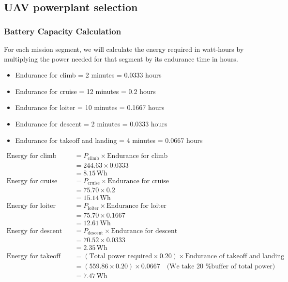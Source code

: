 \documentclass[12 pt]{article}
\begin{document}
\subsection {UAV powerplant selection}

\subsubsection {Battery Capacity Calculation}

For each mission segment, we will calculate the energy required in watt-hours by multiplying the power needed for that segment by its endurance time in hours.

\begin{itemize}
    \item Endurance for climb = 2 minutes = 0.0333 hours
    \item Endurance for cruise = 12 minutes = 0.2 hours
    \item Endurance for loiter = 10 minutes = 0.1667 hours
    \item Endurance for descent = 2 minutes = 0.0333 hours
    \item Endurance for takeoff and landing = 4 minutes = 0.0667 hours
\end{itemize}

\begin{align*}
\text{Energy for climb} &= P_{\text{climb}} \times \text{Endurance for climb} \\
&= 244.63 \times 0.0333 \\
&= 8.15 \, \text{Wh} \\[10pt]
\text{Energy for cruise} &= P_{\text{cruise}} \times \text{Endurance for cruise} \\
&= 75.70 \times 0.2 \\
&= 15.14 \, \text{Wh} \\[10pt]
\text{Energy for loiter} &= P_{\text{loiter}} \times \text{Endurance for loiter} \\
&= 75.70 \times 0.1667 \\
&= 12.61 \, \text{Wh} \\[10pt]
\text{Energy for descent} &= P_{\text{descent}} \times \text{Endurance for descent} \\
&= 70.52 \times 0.0333 \\
&= 2.35 \, \text{Wh} \\[10pt]
\text{Energy for takeoff and landing} &= (\text{Total power required} \times 0.20) \times \text{Endurance of takeoff and landing} \\
&= (559.86 \times 0.20) \times 0.0667 \quad \text{(We take 20 \% buffer of total power)} \\
&= 7.47 \, \text{Wh}
\end{align*}
\end{document}
